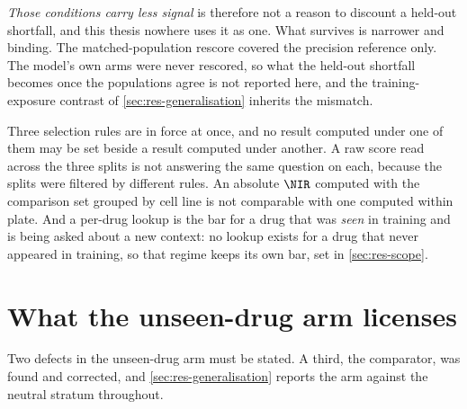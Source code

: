 

\emph{Those conditions carry less signal} is therefore not a reason to discount
a held-out shortfall, and this thesis nowhere uses it as one. What survives is
narrower and binding. The matched-population rescore covered the precision
reference only. The model's own arms were never rescored, so what the held-out
shortfall becomes once the populations agree is not reported here, and the
training-exposure contrast of \cref{sec:res-generalisation} inherits the
mismatch.

%
\begin{scopelimit}
Three selection rules are in force at once, and no result computed under one of
them may be set beside a result computed under another. A raw score read across
the three splits is not answering the same question on each, because the splits
were filtered by different rules. An absolute $\NIR$ computed with the
comparison set grouped by cell line is not comparable with one computed within
plate. And a per-drug lookup is the bar for a drug that was \emph{seen} in
training and is being asked about a new context: no lookup exists for a drug
that never appeared in training, so that regime keeps its own bar, set in
\cref{sec:res-scope}.
\end{scopelimit}

\section{What the unseen-drug arm licenses}

Two defects in the unseen-drug arm must be stated. A third, the comparator, was
found and corrected, and \cref{sec:res-generalisation} reports the arm against
the neutral stratum throughout.

